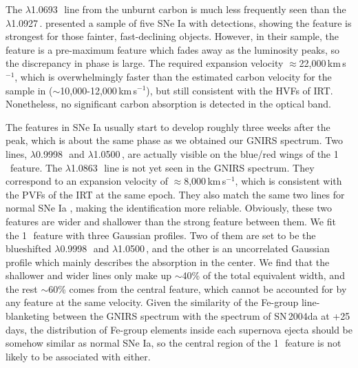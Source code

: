 \documentclass[twocolumn]{aastex631}
\begin{document}
The  $\lambda$1.0693\,\micron\ line from the unburnt carbon is much less frequently seen than the  $\lambda$1.0927\,\micron. \citet{hsiao_CSP_2019} presented a sample of five SNe Ia with  detections, showing the  feature is strongest for those fainter, fast-declining objects. However, in their sample, the  feature is a pre-maximum feature which fades away as the luminosity peaks, so the discrepancy in phase is large. The required expansion velocity $\approx$22,000\,km\,s$^{-1}$, which is overwhelmingly faster than the estimated carbon velocity for the sample in \citet{hsiao_CSP_2019} ($\sim$10,000-12,000\,km\,s$^{-1}$), but still consistent with the HVFs of  IRT. Nonetheless, no significant carbon absorption is detected in the optical band.

The  features in SNe Ia usually start to develop roughly three weeks after the peak, which is about the same phase as we obtained our GNIRS spectrum. Two  lines, $\lambda$0.9998\,\micron\ and $\lambda$1.0500\,\micron, are actually visible on the blue/red wings of the 1\,\micron\ feature. The  $\lambda$1.0863\,\micron\ line is not yet seen in the GNIRS spectrum. They correspond to an expansion velocity of $\approx$8,000\,km\,s$^{-1}$, which is consistent with the PVFs of the  IRT at the same epoch. They also match the same two lines for normal SNe Ia \citep{Marion2009_NIR}, making the identification more reliable. Obviously, these two  features are wider and shallower than the strong feature between them. We fit the 1\,\micron\ feature with three Gaussian profiles. Two of them are set to be the blueshifted  $\lambda$0.9998\,\micron\ and $\lambda$1.0500\,\micron, and the other is an uncorrelated Gaussian profile which mainly describes the absorption in the center. We find that the shallower and wider  lines only make up $\sim$40\% of the total equivalent width, and the rest $\sim$60\% comes from the central feature, which cannot be accounted for by any  feature at the same velocity. Given the similarity of the Fe-group line-blanketing between the GNIRS spectrum with the spectrum of SN\,2004da at +25\,days, the distribution of Fe-group elements inside each supernova ejecta should be somehow similar as normal SNe Ia, so the central region of the 1\,\micron\ feature is not likely to be associated with  either.
\end{document}
